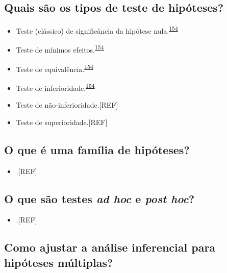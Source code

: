\documentclass[
  a4paper,
]{book}
\providecommand{\tightlist}{%
  \setlength{\itemsep}{0pt}\setlength{\parskip}{0pt}}
\begin{document}
\hypertarget{quais-suxe3o-os-tipos-de-teste-de-hipuxf3teses}{%
\subsection{Quais são os tipos de teste de hipóteses?}\label{quais-suxe3o-os-tipos-de-teste-de-hipuxf3teses}}

\begin{itemize}
\item
  Teste (clássico) de significância da hipótese nula.\textsuperscript{\protect\hyperlink{ref-lakens2018}{154}}
\item
  Teste de mínimos efeitos.\textsuperscript{\protect\hyperlink{ref-lakens2018}{154}}
\item
  Teste de equivalência.\textsuperscript{\protect\hyperlink{ref-lakens2018}{154}}
\item
  Teste de inferioridade.\textsuperscript{\protect\hyperlink{ref-lakens2018}{154}}
\item
  Teste de não-inferioridade.{[}REF{]}
\item
  Teste de superioridade.{[}REF{]}
\end{itemize}

\hypertarget{o-que-uxe9-uma-famuxedlia-de-hipuxf3teses}{%
\subsection{O que é uma família de hipóteses?}\label{o-que-uxe9-uma-famuxedlia-de-hipuxf3teses}}

\begin{itemize}
\tightlist
\item
  .{[}REF{]}
\end{itemize}

\hypertarget{o-que-suxe3o-testes-ad-hoc-e-post-hoc}{%
\subsection{\texorpdfstring{O que são testes \emph{ad hoc} e \emph{post hoc}?}{O que são testes ad hoc e post hoc?}}\label{o-que-suxe3o-testes-ad-hoc-e-post-hoc}}

\begin{itemize}
\tightlist
\item
  .{[}REF{]}
\end{itemize}

\hypertarget{como-ajustar-a-anuxe1lise-inferencial-para-hipuxf3teses-muxfaltiplas}{%
\subsection{Como ajustar a análise inferencial para hipóteses múltiplas?}\label{como-ajustar-a-anuxe1lise-inferencial-para-hipuxf3teses-muxfaltiplas}}
\end{document}
